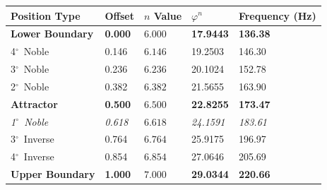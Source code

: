 \documentclass[11pt,a4paper]{article}
\newcommand{\degree}{$^\circ$}  %
\newcommand{\phisym}{\varphi}
\begin{document}
\begin{table}[H]
\centering
\begin{tabular}{@{}lllll@{}}
\toprule
Position Type & Offset & $n$ Value & $\phisym^n$ & Frequency (Hz) \\
\midrule
\textbf{Lower Boundary} & \textbf{0.000} & $\mathbf{6.000}$ & \textbf{17.9443} & \textbf{136.38} \\
4\degree\ Noble & 0.146 & $6.146$ & 19.2503 & 146.30 \\
3\degree\ Noble & 0.236 & $6.236$ & 20.1024 & 152.78 \\
2\degree\ Noble & 0.382 & $6.382$ & 21.5655 & 163.90 \\
\textbf{Attractor} & \textbf{0.500} & $\mathbf{6.500}$ & \textbf{22.8255} & \textbf{173.47} \\
\textit{1\degree\ Noble} & \textit{0.618} & $6.618$ & \textit{24.1591} & \textit{183.61} \\
3\degree\ Inverse & 0.764 & $6.764$ & 25.9175 & 196.97 \\
4\degree\ Inverse & 0.854 & $6.854$ & 27.0646 & 205.69 \\
\textbf{Upper Boundary} & \textbf{1.000} & $\mathbf{7.000}$ & \textbf{29.0344} & \textbf{220.66} \\
\bottomrule
\end{tabular}
\end{table}

\printbibliography
\end{document}

